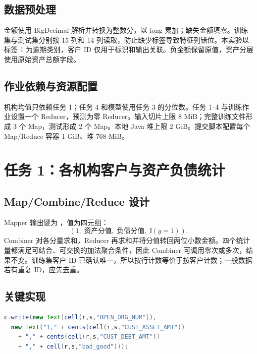 \documentclass[UTF8,a4paper,zihao=5,fontset=none]{ctexart}
\newcommand{\code}[1]{\texttt{\detokenize{#1}}}
\begin{document}
\subsection{数据预处理}
金额使用 BigDecimal 解析并转换为整数分，以 long 累加；缺失金额填零。训练集与测试集分别按 15 列和 14 列读取，防止缺少标签导致特征列错位。本实验以标签 1 为逾期类别，客户 ID 仅用于标识和输出关联。负金额保留原值，资产分层使用原始资产总额字段。

\subsection{作业依赖与资源配置}
\begin{center}
\end{center}
机构均值只依赖任务 1；任务 4 和模型使用任务 3 的分位数。任务 1--4 与训练作业设置一个 Reducer，预测为零 Reducer。输入切片上限 8 MiB；完整训练文件形成 3 个 Map，测试形成 2 个 Map。本地 Java 堆上限 2 GiB。提交脚本配置每个 Map/Reduce 容器 1 GiB、堆 768 MiB。

\section{任务 1：各机构客户与资产负债统计}
\subsection{Map/Combine/Reduce 设计}
Mapper 输出键为 \code{OPEN_ORG_NUM}，值为四元组：
\[
 (1,\;\text{资产分值},\;\text{负债分值},\;\mathbb{I}(y=1)).
\]
Combiner 对各分量求和，Reducer 再求和并将分值转回两位小数金额。四个统计量都满足可结合、可交换的加法聚合条件，因此 Combiner 可调用零次或多次，结果不变。训练集客户 ID 已确认唯一，所以按行计数等价于按客户计数；一般数据若有重复 ID，应先去重。

\subsection{关键实现}
\begin{lstlisting}[language=Java]
c.write(new Text(cell(r,s,"OPEN_ORG_NUM")),
  new Text("1," + cents(cell(r,s,"CUST_ASSET_AMT"))
    + "," + cents(cell(r,s,"CUST_DEBT_AMT"))
    + "," + cell(r,s,"bad_good")));
\end{lstlisting}
\end{document}
